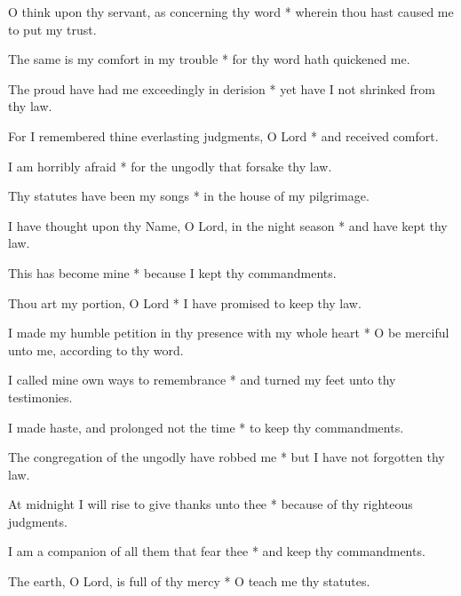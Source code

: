 O think upon thy servant, as concerning thy word * wherein thou hast caused me to put my trust.

The same is my comfort in my trouble * for thy word hath quickened me.

The proud have had me exceedingly in derision * yet have I not shrinked from thy law.

For I remembered thine everlasting judgments, O Lord * and received comfort.

I am horribly afraid * for the ungodly that forsake thy law.

Thy statutes have been my songs * in the house of my pilgrimage.

I have thought upon thy Name, O Lord, in the night season * and have kept thy law.

This has become mine * because I kept thy commandments.

Thou art my portion, O Lord * I have promised to keep thy law.

I made my humble petition in thy presence with my whole heart * O be merciful unto me, according to thy word.

I called mine own ways to remembrance * and turned my feet unto thy testimonies.

I made haste, and prolonged not the time * to keep thy commandments.

The congregation of the ungodly have robbed me * but I have not forgotten thy law.

At midnight I will rise to give thanks unto thee * because of thy righteous judgments.

I am a companion of all them that fear thee * and keep thy commandments.

The earth, O Lord, is full of thy mercy * O teach me thy statutes.